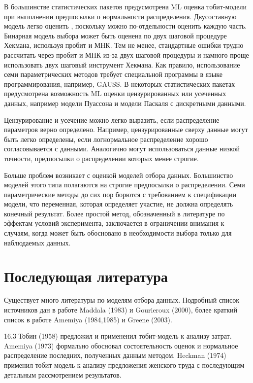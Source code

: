 В большинстве статистических пакетов предусмотрена ML оценка тобит-модели при выполнении предпосылки о нормальности распределения. Двусоставную модель легко оценить , поскольку можно по-отдельности оценить каждую часть. Бинарная модель выбора может быть оценена по двух шаговой процедуре Хекмана, используя пробит и МНК. Тем не менее, стандартные ошибки трудно рассчитать через пробит и МНК из-за двух шаговой процедуры и намного проще использовать двух шаговый инструмент Хекмана. Как правило, использование семи параметрических методов требует специальной программы в языке программирования, например, GAUSS. В некоторых статистических пакетах предусмотрена возможность ML оценки цензурированных или усеченных данных, например модели Пуассона и модели Паскаля с дискретными данными.

Цензурирование и усечение можно легко выразить, если распределение параметров верно определено. Например, цензурированные сверху данные могут быть легко определены, если логнормальное распределение хорошо согласовывается с данными. Аналогично могут использоваться данные низкой точности, предпосылки о распределении которых менее строгие. 

Больше проблем возникает с оценкой моделей отбора данных. Большинство моделей этого типа полагаются на строгие предпосылки о распределении. Семи параметрические методы до сих пор борются с требованием к спецификации модели, что переменная, которая определяет участие, не должна определять конечный результат. Более простой метод, обозначенный в литературе по эффектам условий эксперимента, заключается в ограничении внимания к случаям, когда может быть обосновано в необходимости выбора только для наблюдаемых данных.

\section{Последующая литература}

Существует много литературы по моделям отбора данных. Подробный список источников дан в работе Maddala (1983) и Gourieroux (2000), более краткий список в работе Amemiya (1984,1985) и Greene (2003). 

16.3 Тобин (1958) предложил и примененил тобит-модель к анализу затрат. Amemiya (1973) формально обосновал состоятельность оценок и нормальное распределение последних, полученных данным методом. Heckman (1974) применил тобит-модель к анализу предложения женского труда с последующим детальным рассмотрением результатов.

